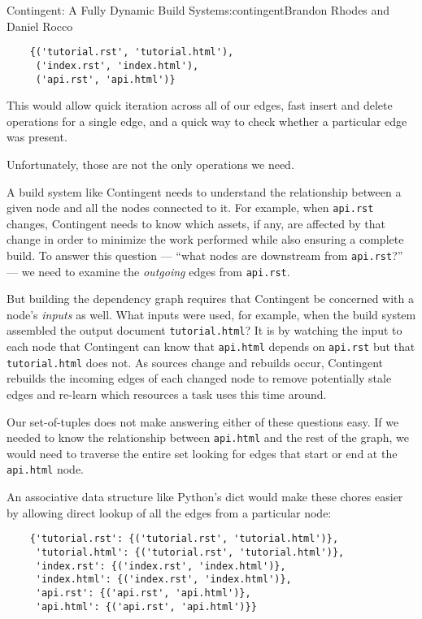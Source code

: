 \begin{aosachapter}{Contingent: A Fully Dynamic Build System}{s:contingent}{Brandon Rhodes and Daniel Rocco}
\begin{verbatim}
    {('tutorial.rst', 'tutorial.html'),
     ('index.rst', 'index.html'),
     ('api.rst', 'api.html')}
\end{verbatim}

This would allow quick iteration across all of our edges, fast insert
and delete operations for a single edge, and a quick way to check
whether a particular edge was present.

Unfortunately, those are not the only operations we need.

A build system like Contingent needs to understand the relationship
between a given node and all the nodes connected to it. For example,
when \texttt{api.rst} changes, Contingent needs to know which assets, if
any, are affected by that change in order to minimize the work performed
while also ensuring a complete build. To answer this question --- ``what
nodes are downstream from \texttt{api.rst}?'' --- we need to examine the
\emph{outgoing} edges from \texttt{api.rst}.

But building the dependency graph requires that Contingent be concerned
with a node's \emph{inputs} as well. What inputs were used, for example,
when the build system assembled the output document
\texttt{tutorial.html}? It is by watching the input to each node that
Contingent can know that \texttt{api.html} depends on \texttt{api.rst}
but that \texttt{tutorial.html} does not. As sources change and rebuilds
occur, Contingent rebuilds the incoming edges of each changed node to
remove potentially stale edges and re-learn which resources a task uses
this time around.

Our set-of-tuples does not make answering either of these questions
easy. If we needed to know the relationship between \texttt{api.html}
and the rest of the graph, we would need to traverse the entire set
looking for edges that start or end at the \texttt{api.html} node.

An associative data structure like Python's dict would make these chores
easier by allowing direct lookup of all the edges from a particular
node:

\begin{verbatim}
    {'tutorial.rst': {('tutorial.rst', 'tutorial.html')},
     'tutorial.html': {('tutorial.rst', 'tutorial.html')},
     'index.rst': {('index.rst', 'index.html')},
     'index.html': {('index.rst', 'index.html')},
     'api.rst': {('api.rst', 'api.html')},
     'api.html': {('api.rst', 'api.html')}}
\end{verbatim}


\end{aosachapter}
